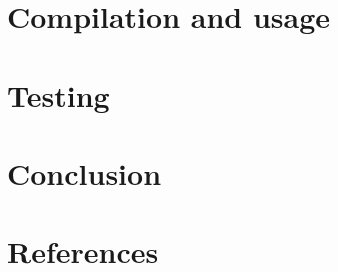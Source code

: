 \documentclass[a4paper]{article}
\begin{document}


\pagebreak

\section{Compilation and usage}



\pagebreak

\section{Testing}



\pagebreak

\section{Conclusion}



\pagebreak

\section{References}

\nocite{*}

\printbibliography[type=online, heading=subbibliography, title=Sitography]
\end{document}
